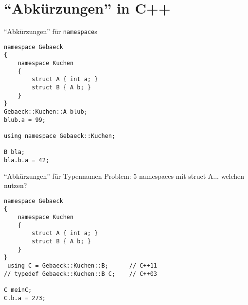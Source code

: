 \section{\enquote{Abkürzungen} in C++}

\begin{frame}[fragile]{\enquote{Abkürzungen} für \texttt{namespace}s}
	
	\begin{lstlisting}[]
namespace Gebaeck
{
    namespace Kuchen
    {
        struct A { int a; }
        struct B { A b; }
    }
}
Gebaeck::Kuchen::A blub;
blub.a = 99;

using namespace Gebaeck::Kuchen;

B bla;
bla.b.a = 42;
	\end{lstlisting}
\end{frame}

\begin{frame}[fragile]{\enquote{Abkürzungen} für Typennamen}
	Problem: 5 namespaces mit struct A... welchen nutzen?

	\begin{lstlisting}[]
namespace Gebaeck
{
    namespace Kuchen
    {
        struct A { int a; }
        struct B { A b; }
    }
}
 using C = Gebaeck::Kuchen::B;      // C++11
// typedef Gebaeck::Kuchen::B C;    // C++03

C meinC;
C.b.a = 273;
	\end{lstlisting}
\end{frame}


